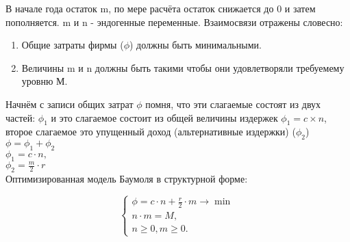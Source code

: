 \documentclass[12pt,a4paper]{article}
\begin{document}

В начале года остаток m, по мере расчёта остаток снижается до 0 и затем пополняется. m и n - эндогенные переменные. Взаимосвязи отражены словесно:
\begin{enumerate}
\item Общие затраты фирмы ($\phi$) должны быть минимальными.
\item Величины m и n должны быть такими чтобы они удовлетворяли требуемему уровню М.
\end{enumerate}

Начнём с записи общих затрат $\phi$ помня, что эти слагаемые состоят из двух частей:
$\phi_1$ и это слагаемое состоит из общей величины издержек $\phi_1 = c \times n$, второе слагаемое это упущенный доход (альтернативные издержки) ($\phi_2$) \\
$\phi = \phi_1 + \phi_2$\\
$\phi_1 = c \cdot n,$\\
$\phi_2 = \frac{m}{2} \cdot r$\\

Оптимизированная модель Баумоля в структурной форме:

\begin{equation}
	\begin{cases}
	\phi = c \cdot n + \displaystyle{\frac{r}{2}} \cdot m \rightarrow \min \\
	n \cdot m = M, \\
	n \geq 0, m \geq 0.
	\end{cases}
\end{equation}
\end{document}
